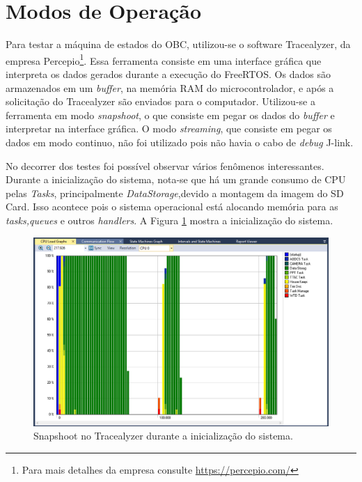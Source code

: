 \section{Modos de Operação}


Para testar a máquina de estados do OBC, utilizou-se o software Tracealyzer, da empresa Percepio\footnote{Para mais detalhes da empresa consulte \url{https://percepio.com/}}. Essa ferramenta consiste em uma interface gráfica que interpreta os dados gerados durante a execução do FreeRTOS. Os dados são armazenados em um \textit{buffer}, na memória RAM do microcontrolador, e após a solicitação do Tracealyzer são enviados para o computador. Utilizou-se a ferramenta em modo \textit{snapshoot}, o que consiste em pegar os dados do \textit{buffer} e interpretar na interface gráfica. O modo \textit{streaming}, que consiste em pegar os dados em modo continuo, não foi utilizado pois não havia o cabo de \textit{debug} J-link.

No decorrer dos testes foi possível observar vários fenômenos interessantes. Durante a inicialização do sistema, nota-se que há um grande consumo de CPU pelas \textit{Tasks}, principalmente \textit{DataStorage},devido a montagem da imagem do SD Card. Isso acontece pois o sistema operacional está alocando memória para as \textit{tasks,queues} e outros \textit{handlers}. A Figura \ref{trace_snapshoot_1} mostra a inicialização do sistema.

\begin{figure}[h]
	\centering
	\caption{Snapshoot no Tracealyzer durante a inicialização do sistema.}
	\includegraphics[keepaspectratio=true,scale=0.51]{figuras/trace_snapshoot_1.PNG}
	
	\label{trace_snapshoot_1}
\end{figure}
\FloatBarrier

